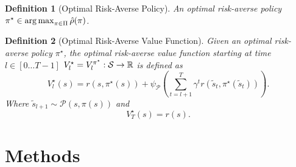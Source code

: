 \documentclass[10pt]{article}
\newtheorem{definition}{Definition}
\theoremstyle{plain}
\theoremstyle{remark}
\begin{document}
\begin{definition}[Optimal Risk-Averse Policy]\label{def:optimal_risk_averse_policy}
        An optimal risk-averse policy $\pi^\star \in \operatorname*{arg\,max}_{\pi \in \Pi} \hat{\rho}(\pi)$.
\end{definition}

\begin{definition}[Optimal Risk-Averse Value Function]\label{def:optimal_risk_averse_value_function}
        Given an optimal risk-averse policy $\pi^\star$, the optimal risk-averse value function starting at time $l \in [0\ldots T-1]$ $V^\star_l = V^{\pi^\star}_l : \mathcal{S} \to \mathbb{R}$ is defined as
        \[
                V^\star_l(s) = r(s,\pi^\star(s)) + \psi_\mathcal{P} \left( \sum_{t=l+1}^{T} \gamma^t r(\tilde{s}_t, \pi^\star(\tilde{s}_t)) \right).
        \]
        Where $\tilde{s}_{l+1} \sim \mathcal{P}(s, \pi(s))$ and
        \[
          V^\star_T(s) = r(s).
        \]
\end{definition}




\section{Methods}


\end{document}
